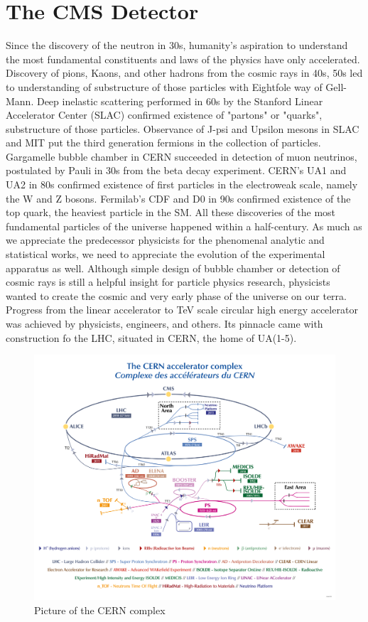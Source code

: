 \chapter{The CMS Detector}\label{sec:detectors}

Since the discovery of the neutron in 30s, humanity's aspiration to understand the most fundamental constituents and laws of the physics have only accelerated.
Discovery of pions, Kaons, and other hadrons from the cosmic rays in 40s, 50s led to understanding of substructure of those particles with Eightfole way of Gell-Mann.
Deep inelastic scattering performed in 60s by the Stanford Linear Accelerator Center (SLAC) confirmed existence of "partons" or "quarks", substructure of those particles.
Observance of J-psi and Upsilon mesons in SLAC and MIT put the third generation fermions in the collection of particles.
Gargamelle bubble chamber in CERN succeeded in detection of muon neutrinos, postulated by Pauli in 30s from the beta decay experiment.
CERN's UA1 and UA2 in 80s confirmed existence of first particles in the electroweak scale, namely the W and Z bosons.
Fermilab's CDF and D0 in 90s confirmed existence of the top quark, the heaviest particle in the SM.
All these discoveries of the most fundamental particles of the universe happened within a half-century.
As much as we appreciate the predecessor physicists for the phenomenal analytic and statistical works, we need to appreciate the evolution of the experimental apparatus as well.
Although simple design of bubble chamber or detection of cosmic rays is still a helpful insight for particle physics research, physicists wanted to create the cosmic and very early phase of the universe on our terra.
Progress from the linear accelerator to TeV scale circular high energy accelerator was achieved by physicists, engineers, and others.
Its pinnacle came with construction fo the LHC, situated in CERN, the home of UA(1-5). 

\begin{figure}[h!]
	\caption{Picture of the CERN complex \cite{CERN}}
  \label{fig:CERN}
  \centering
  \includegraphics[width=0.9\linewidth]{figs/LHC.png}
\end{figure}


